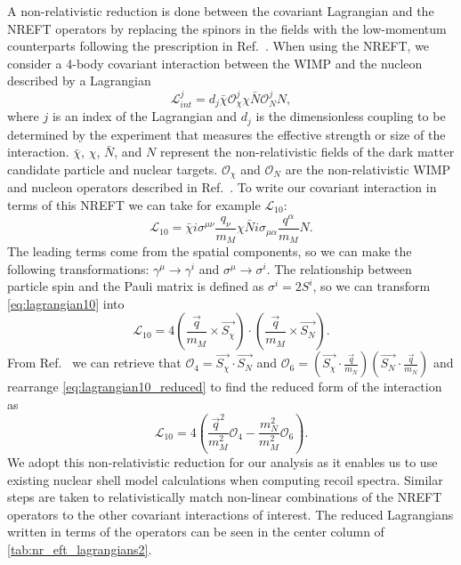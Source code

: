 \documentclass[reprint, showpacs,
preprintnumbers,
amsmath,amssymb,
aps, floatfix,
superscriptaddress,
prd, nofootinbib]{revtex4-1}
\begin{document}
A non-relativistic reduction is done between the covariant Lagrangian and the NREFT operators by replacing the spinors in the fields with the low-momentum counterparts following the prescription in Ref.~\cite{Anand:MathematicaEFT}. 
When using the NREFT, we consider a 4-body covariant interaction between the WIMP and the nucleon described by a Lagrangian
\begin{equation}
    \mathcal{L}^j_{int} = d_j\bar{\chi}\mathcal{O}_\chi^j \chi \bar{N}\mathcal{O}_N^j N,
    \label{eq:general_LD}
\end{equation}
where $j$ is an index of the Lagrangian and $d_j$ is the dimensionless coupling to be determined by the experiment that measures the effective strength or size of the interaction. 
$\bar{\chi}$, $\chi$, $\bar{N}$, and $N$ represent the non-relativistic fields of the dark matter candidate particle and nuclear targets.
$\mathcal{O}_\chi$ and $\mathcal{O}_N$ are the non-relativistic WIMP and nucleon operators described in Ref.~\cite{Anand:MathematicaEFT}. 
To write our covariant interaction in terms of this NREFT we can take for example $\mathcal{L}_{10}$: 
\begin{equation}
    \mathcal{L}_{10} = \bar{\chi} i \sigma^{\mu \nu} \frac{q_\nu}{m_M} \chi \bar{N} i \sigma_{\mu \alpha} \frac{q^\alpha}{m_M} N.
    \label{eq:lagrangian10}
\end{equation}
The leading terms come from the spatial components, so we can make the following transformations: $\gamma^{\mu} \rightarrow \gamma^{i}$ and $\sigma^{\mu} \rightarrow \sigma^{i}$. 
The relationship between particle spin and the Pauli matrix is defined as $\sigma^{i} = 2S^{i}$, so we can transform \autoref{eq:lagrangian10} into
\begin{equation}
    \mathcal{L}_{10} = 4(\frac{\vec{q}}{m_M} \times \vec{S_{\chi}}) \cdot (\frac{\vec{q}}{m_M} \times \vec{S_{N}}).
    \label{eq:lagrangian10_reduced}
\end{equation}
From Ref.~\cite{Anand:MathematicaEFT} we can retrieve that $\mathcal{O}_{4} = \vec{S_{\chi}}\cdot \vec{S_{N}}$ and  $\mathcal{O}_{6} = (\vec{S_{\chi}} \cdot \frac{\vec{q}}{m_N})(\vec{S_{N}} \cdot \frac{\vec{q}}{m_N})$ and rearrange \autoref{eq:lagrangian10_reduced} to find the reduced form of the interaction as
\begin{equation}
     \mathcal{L}_{10} = 4(\frac{\vec{q}^2}{m^2_M}\mathcal{O}_4 - \frac{m^2_N}{m^2_M}\mathcal{O}_6).
    \label{eq:lagrangian10_operator}
\end{equation}
We adopt this non-relativistic reduction for our analysis as it enables us to use existing nuclear shell model calculations when computing recoil spectra. 
Similar steps are taken to relativistically match non-linear combinations of the NREFT operators to the other covariant interactions of interest. 
The reduced Lagrangians written in terms of the operators can be seen in the center column of \autoref{tab:nr_eft_lagrangians2}.
\end{document}
